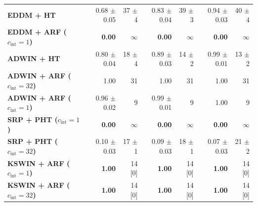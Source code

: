 \begin{table}[t]
\begin{tabular}{@{}lrrrrrr@{}}
    \midrule
    \textbf{EDDM + HT}                             & 0.68 {\small $\pm$0.05}                   & 37 {\small $\pm$4}                              & 0.83 {\small $\pm$0.04}                          & 39 {\small $\pm$3} & 0.94 {\small $\pm$0.03} & 40 {\small $\pm$4} \\
    \textbf{EDDM + ARF ($c_{\mathrm{int}} = 1$)}   & \textbf{0.00}                             & $\infty$                                        & \textbf{0.00}                                    & $\infty$           & \textbf{0.00}           & $\infty$           \\
    \midrule
    \textbf{ADWIN + HT}                            & 0.80 {\small $\pm$0.04}                   & 18 {\small $\pm$4}                              & 0.89 {\small $\pm$0.03}                          & 14 {\small $\pm$2} & 0.99 {\small $\pm$0.01} & 13 {\small $\pm$2} \\
    \textbf{ADWIN + ARF ($c_{\mathrm{int}} = 32$)} & 1.00                                      & 31                                              & 1.00                                             & 31                 & 1.00                    & 31                 \\
    \textbf{ADWIN + ARF ($c_{\mathrm{int}} = 1$)}  & 0.96 {\small $\pm$0.02}                   & 9                                               & 0.99 {\small $\pm$0.01}                          & 9                  & 1.00                    & 9                  \\
    \midrule
    \textbf{SRP + PHT ($c_{\mathrm{int}} = 1$)}    & \textbf{0.00}                             & $\infty$                                        & \textbf{0.00}                                    & $\infty$           & \textbf{0.00}           & $\infty$           \\
    \textbf{SRP + PHT ($c_{\mathrm{int}} = 32$)}   & 0.10 {\small $\pm$0.03}                   & 17 {\small $\pm$1}                              & 0.09 {\small $\pm$0.03}                          & 18 {\small $\pm$1} & 0.07 {\small $\pm$0.03} & 21 {\small $\pm$2} \\
    \textbf{KSWIN + ARF ($c_{\mathrm{int}} = 1$)}  & \textbf{1.00}                             & 14 [0]                                          & \textbf{1.00}                                    & 14 [0]             & \textbf{1.00}           & 14 [0]             \\
    \textbf{KSWIN + ARF ($c_{\mathrm{int}} = 32$)} & \textbf{1.00}                             & 14 [0]                                          & \textbf{1.00}                                    & 14 [0]             & \textbf{1.00}           & 14 [0]             \\

\end{tabular}
\end{table}
